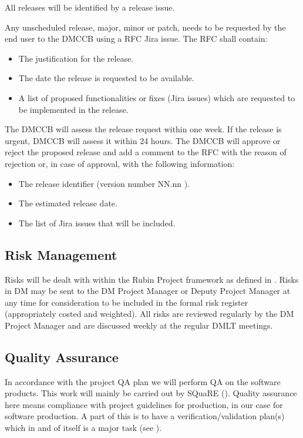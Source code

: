 All releases will be identified by a release issue.

Any unscheduled release, major, minor or \gls{patch}, needs to be requested by the end user to the  \gls{DMCCB} using a \gls{RFC} Jira issue. The RFC  shall contain:

\begin{itemize}
\item The justification for the release.
\item The date the release is requested to be available.
\item A list of proposed functionalities or fixes (Jira issues) which are requested to be implemented in the release.
\end{itemize}

The  DMCCB will assess the release request within one week. If the release is urgent,  DMCCB will assess it within 24 hours.
The  DMCCB will approve or reject the proposed release and add a comment to the RFC  with the reason of rejection or, in case of approval, with the following information:

\begin{itemize}
\item The release identifier (version number NN.nn ).
\item The estimated release date.
\item The list of Jira issues that will be included.
\end{itemize}


\subsection {Risk Management } \label{sect:risk}

Risks will be dealt with within the Rubin Project framework as defined in .
Risks in DM may be sent to the DM \gls{Project Manager} or Deputy \gls{Project Manager} at any time for consideration to be included in the formal risk register (appropriately costed and weighted).
All risks are reviewed regularly by the DM \gls{Project Manager} and are discussed weekly at the regular DMLT  meetings.


\subsection {Quality Assurance  } \label{sect:pa}

In accordance with the project \gls{QA} plan  we will perform \gls{QA} on the software products.
This work will mainly be carried out by \gls{SQuaRE} ().
Quality assurance here means compliance with project guidelines for production, in our case for software production.
A part of this is to have a verification/validation plan(s) which in and of itself is a major task (see ).


